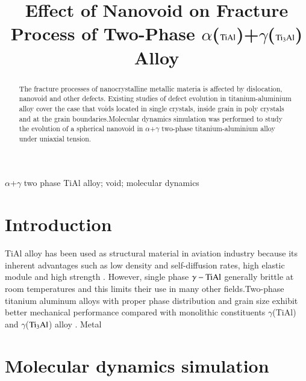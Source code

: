 \documentclass[final,5p,times,twocolumn]{elsarticle}
\begin{document}
\begin{frontmatter}
\title{Effect of Nanovoid on Fracture Process of Two-Phase $\alpha$($\rm TiAl$)+$\gamma$($\rm Ti_3Al$) Alloy}

\address[mymainaddress]{School of Mechanical and Electronical Engineering, Lanzhou University of Technology. Lanzhou 730050, China}
\begin{abstract}
 The fracture processes of nanocrystalline metallic materia is affected by dislocation, nanovoid and other defects. Existing studies of defect evolution in titanium-aluminium alloy cover the case that voids located in single crystals, inside grain in poly crystals and at the grain boundaries.Molecular dynamics simulation was performed to study the evolution of a spherical nanovoid in $\alpha$+$\gamma$ two-phase titanium-aluminium alloy under uniaxial tension.
\end{abstract}
\begin{keyword}
$\alpha$+$\gamma$ two phase TiAl alloy; void; molecular dynamics
\end{keyword}
\end{frontmatter}
\linenumbers

\section{Introduction}
TiAl alloy has been used as structural material in aviation industry because its inherent advantages such as low density and self-diffusion rates, high elastic module and high strength \cite{int.uti.j.1}. However, single phase $\gamma-\rm TiAl$ generally brittle at room temperatures and this limits their use in many other fields.Two-phase titanium aluminum alloys with proper phase distribution and grain size exhibit better mechanical performance compared with monolithic constituents $\gamma$(TiAl) and $\gamma$($\rm Ti_3Al$) alloy \cite{int.uti.m.1}.
Metal 

\section{Molecular dynamics simulation}
\end{document}
